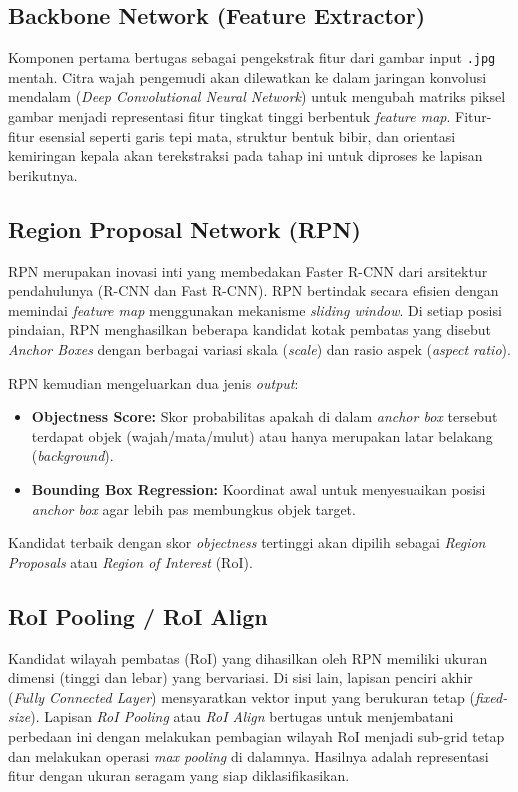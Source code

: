 \documentclass[11pt,a4paper,oneside]{report}
\begin{document}
\subsection{Backbone Network (Feature Extractor)}
Komponen pertama bertugas sebagai pengekstrak fitur dari gambar input \texttt{.jpg} mentah. Citra wajah pengemudi akan dilewatkan ke dalam jaringan konvolusi mendalam (\textit{Deep Convolutional Neural Network}) untuk mengubah matriks piksel gambar menjadi representasi fitur tingkat tinggi berbentuk \textit{feature map}. Fitur-fitur esensial seperti garis tepi mata, struktur bentuk bibir, dan orientasi kemiringan kepala akan terekstraksi pada tahap ini untuk diproses ke lapisan berikutnya.

\subsection{Region Proposal Network (RPN)}
RPN merupakan inovasi inti yang membedakan Faster R-CNN dari arsitektur pendahulunya (R-CNN dan Fast R-CNN). RPN bertindak secara efisien dengan memindai \textit{feature map} menggunakan mekanisme \textit{sliding window}. Di setiap posisi pindaian, RPN menghasilkan beberapa kandidat kotak pembatas yang disebut \textit{Anchor Boxes} dengan berbagai variasi skala (\textit{scale}) dan rasio aspek (\textit{aspect ratio}). 

RPN kemudian mengeluarkan dua jenis \textit{output}:
\begin{itemize}
    \item \textbf{Objectness Score:} Skor probabilitas apakah di dalam \textit{anchor box} tersebut terdapat objek (wajah/mata/mulut) atau hanya merupakan latar belakang (\textit{background}).
    \item \textbf{Bounding Box Regression:} Koordinat awal untuk menyesuaikan posisi \textit{anchor box} agar lebih pas membungkus objek target.
\end{itemize}
Kandidat terbaik dengan skor \textit{objectness} tertinggi akan dipilih sebagai \textit{Region Proposals} atau \textit{Region of Interest} (RoI).

\subsection{RoI Pooling / RoI Align}
Kandidat wilayah pembatas (RoI) yang dihasilkan oleh RPN memiliki ukuran dimensi (tinggi dan lebar) yang bervariasi. Di sisi lain, lapisan penciri akhir (\textit{Fully Connected Layer}) mensyaratkan vektor input yang berukuran tetap (\textit{fixed-size}). Lapisan \textit{RoI Pooling} atau \textit{RoI Align} bertugas untuk menjembatani perbedaan ini dengan melakukan pembagian wilayah RoI menjadi sub-grid tetap dan melakukan operasi \textit{max pooling} di dalamnya. Hasilnya adalah representasi fitur dengan ukuran seragam yang siap diklasifikasikan.
\end{document}
